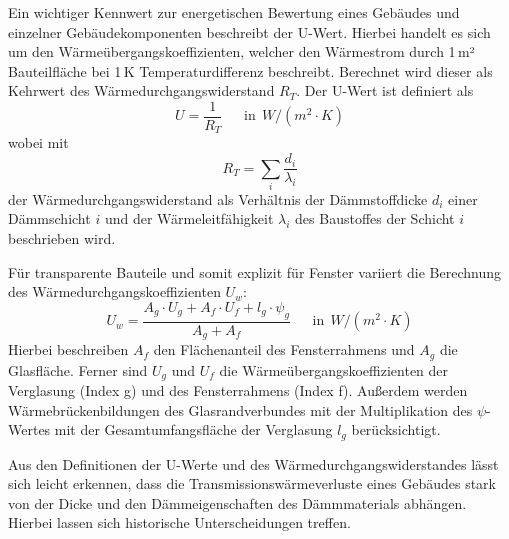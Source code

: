 Ein wichtiger Kennwert zur energetischen Bewertung eines Gebäudes und einzelner Gebäudekomponenten beschreibt der U-Wert.
Hierbei handelt es sich um den Wärmeübergangskoeffizienten, welcher den Wärmestrom durch 1\,m² Bauteilfläche bei 1\,K Temperaturdifferenz beschreibt. 
Berechnet wird dieser als Kehrwert des Wärmedurchgangswiderstand \(R_T\). 
Der U-Wert ist definiert als
\begin{equation}
\label{eq:Gleichung221}
U = \frac{1}{R_T}  \ \ \ \ \ \ \ \text{in} \ \ W/(m^2 \cdot K)
\end{equation}
wobei mit
\begin{equation}
\label{eq:Gleichung222}
R_T = \sum \limits_{i} \frac{d_i}{\lambda_i}	
\end{equation}				%
der Wärmedurchgangswiderstand als Verhältnis der Dämmstoffdicke \(d_i\) einer Dämmschicht \(i\) und der Wärmeleitfähigkeit \(\lambda_i\) des Baustoffes der Schicht \(i\) beschrieben wird. 

Für transparente Bauteile und somit explizit für Fenster variiert die Berechnung des Wärmedurchgangskoeffizienten \(U_w\):
\begin{equation}
\label{eq:Gleichung223}
U_w = \frac{A_g \cdot U_g + A_f \cdot U_f + l_g \cdot \psi_g}{A_g + A_f}  \ \ \ \ \ \ \ \text{in} \ \ W/(m^2 \cdot K)
\end{equation}
Hierbei beschreiben \(A_f\) den Flächenanteil des Fensterrahmens und \(A_g\) die Glasfläche. Ferner sind \(U_g\) und \(U_f\) die Wärmeübergangskoeffizienten der Verglasung (Index g) und des Fensterrahmens (Index f). 
Außerdem werden Wärmebrückenbildungen des Glasrandverbundes mit der Multiplikation des \(\psi\)-Wertes mit der Gesamtumfangsfläche der Verglasung \(l_g\) berücksichtigt. \cite{Laasch.2013}

Aus den Definitionen der U-Werte und des Wärmedurchgangswiderstandes lässt sich leicht erkennen, dass die Transmissionswärmeverluste eines Gebäudes stark von der Dicke und den Dämmeigenschaften des Dämmmaterials abhängen. 
Hierbei lassen sich historische Unterscheidungen treffen.

